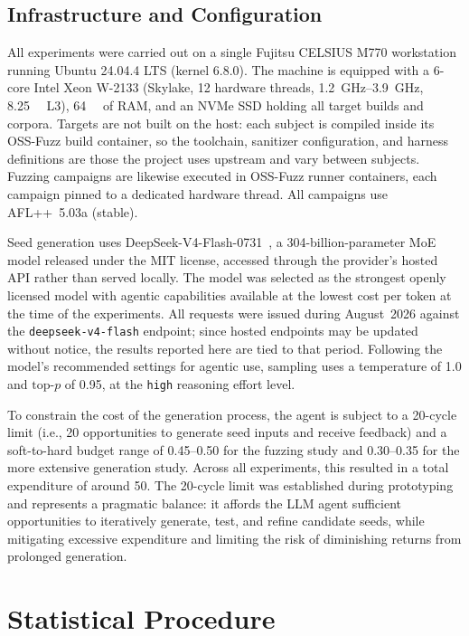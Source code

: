 \subsection{Infrastructure and Configuration}
All experiments were carried out on a single Fujitsu CELSIUS M770 workstation running Ubuntu 24.04.4 LTS (kernel 6.8.0).
The machine is equipped with a \num{6}-core Intel Xeon W-2133 (Skylake, \num{12} hardware threads, \SIrange{1.2}{3.9}{\giga\hertz}, \SI{8.25}{\mebi\byte} L3), \SI{64}{\gibi\byte} of RAM, and an NVMe SSD holding all target builds and corpora.
Targets are not built on the host: each subject is compiled inside its OSS-Fuzz build container, so the toolchain, sanitizer configuration, and harness definitions are those the project uses upstream and vary between subjects.
Fuzzing campaigns are likewise executed in OSS-Fuzz runner containers, each campaign pinned to a dedicated hardware thread.
All campaigns use AFL++~5.03a (stable).

Seed generation uses DeepSeek-V4-Flash-0731~\cite{deepseek-aiDeepSeekV4HighlyEfficient2026}, a \num{304}-billion-parameter MoE model released under the MIT license, accessed through the provider's hosted \ac{API} rather than served locally.
The model was selected as the strongest openly licensed model with agentic capabilities available at the lowest cost per token at the time of the experiments.
All requests were issued during August~2026 against the \texttt{deepseek-v4-flash} endpoint; since hosted endpoints may be updated without notice, the results reported here are tied to that period.
Following the model's recommended settings for agentic use, sampling uses a temperature of \num{1.0} and $\text{top-}p$ of \num{0.95}, at the \texttt{high} reasoning effort level.

To constrain the cost of the generation process, the agent is subject to a \num{20}-cycle limit (i.e., \num{20} opportunities to generate seed inputs and receive feedback) and a soft-to-hard budget range of \SIrange{0.45}{0.50}{\USD} for the fuzzing study and \SIrange{0.30}{0.35}{\USD} for the more extensive generation study.
Across all experiments, this resulted in a total expenditure of around \SI{50}{\USD}.
The \num{20}-cycle limit was established during prototyping and represents a pragmatic balance: it affords the LLM agent sufficient opportunities to iteratively generate, test, and refine candidate seeds, while mitigating excessive expenditure and limiting the risk of diminishing returns from prolonged generation.

\section{Statistical Procedure}\label{sec:eval:statistics}

